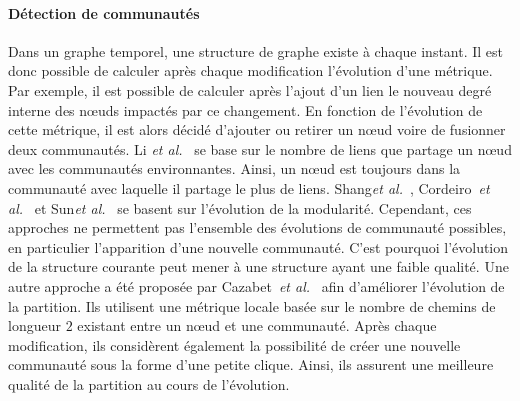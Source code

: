 \paragraph{Détection de communautés}
Dans un graphe temporel, une structure de graphe existe à chaque instant.
Il est donc possible de calculer après chaque modification l'évolution d'une métrique.
Par exemple, il est possible de calculer après l'ajout d'un lien le nouveau degré interne des n\oe{}uds impactés par ce changement.
En fonction de l'évolution de cette métrique, il est alors décidé d'ajouter ou retirer un n\oe{}ud voire de fusionner deux communautés.
Li \emph{et al.}~\cite{Li2012a} se base sur le nombre de liens que partage un n\oe{}ud avec les communautés environnantes.
Ainsi, un n\oe{}ud est toujours dans la communauté avec laquelle il partage le plus de liens.
Shang\emph{et al.}~\cite{Shang2014a}, Cordeiro~\emph{et al.}~\cite{Cordeiro2016} et Sun\emph{et al.}~\cite{Sun2014} se basent sur l'évolution de la modularité.
Cependant, ces approches ne permettent pas l'ensemble des évolutions de communauté possibles, en particulier l'apparition d'une nouvelle communauté.
C'est pourquoi l'évolution de la structure courante peut mener à une structure ayant une faible qualité.
Une autre approche a été proposée par Cazabet~\emph{et al.}~\cite{Cazabet2010} afin d'améliorer l'évolution de la partition.
Ils utilisent une métrique locale basée sur le nombre de chemins de longueur $2$ existant entre un n\oe{}ud et une communauté.
Après chaque modification, ils considèrent également la possibilité de créer une nouvelle communauté sous la forme d'une petite clique.
Ainsi, ils assurent une meilleure qualité de la partition au cours de l'évolution.


